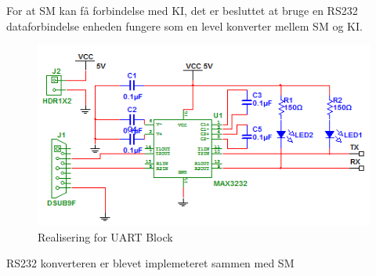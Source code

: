 For at SM kan få forbindelse med KI,   det er besluttet at bruge en RS232 dataforbindelse enheden fungere som en level konverter mellem SM og KI. 
\begin{figure}[H]
\centering
\includegraphics[scale=1]{billeder/HWUART}
\caption{Realisering for UART Block}
\label{fig:SMHWUARTB}
\end{figure}
RS232 konverteren er blevet implemeteret sammen med SM 
